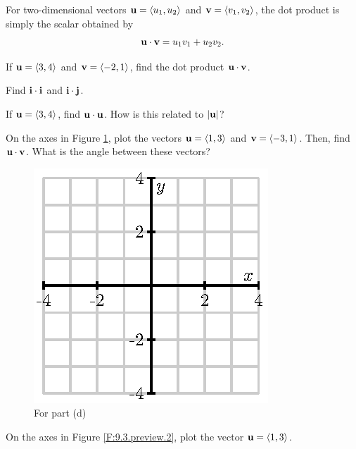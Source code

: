 \begin{pa} \label{PA:9.3}
  For two-dimensional vectors $\mathbf{u}=\langle u_1,u_2\rangle$ and
  $\mathbf{v}=\langle v_1, v_2\rangle$, the dot product is simply the scalar
  obtained by
  $$
  \mathbf{u}\cdot\mathbf{v} = u_1v_1 + u_2v_2.
  $$

    \ba
  \item If $\mathbf{u}=\langle 3, 4\rangle$ and $\mathbf{v}=\langle -2, 1\rangle$,
    find the dot product $\mathbf{u}\cdot\mathbf{v}$.

  \item Find $\mathbf{i}\cdot\mathbf{i}$ and $\mathbf{i}\cdot\mathbf{j}$.

  \item If $\mathbf{u}=\langle 3, 4\rangle$, find $\mathbf{u}\cdot\mathbf{u}$.  How is this
    related to $|\mathbf{u}|$?

  \item On the axes in Figure \ref{F:9.3.preview.1}, plot the
    vectors $\mathbf{u}=\langle 1, 3\rangle$ and $\mathbf{v}=\langle -3, 1\rangle$.  Then, 
    find $\mathbf{u}\cdot\mathbf{v}$.  What is the angle between these vectors?  

    \begin{figure}[ht]
      \begin{center}
        \includegraphics{figures/fig_9_3_preview_1.eps}
        \caption{For part (d)}
        \label{F:9.3.preview.1}
      \end{center}
    \end{figure}

  \item On the axes in Figure \ref{F:9.3.preview.2}, plot the
    vector $\mathbf{u}=\langle 1, 3\rangle$.


\end{pa}
